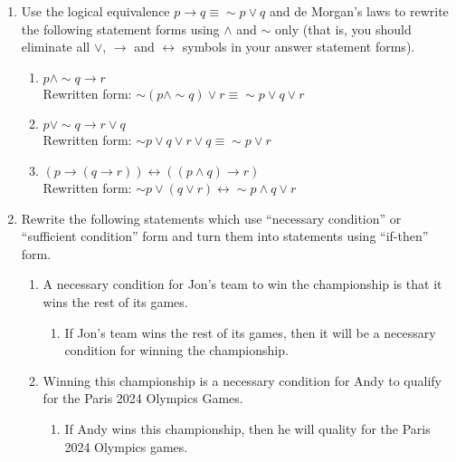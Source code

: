 \documentclass{article}
\begin{document}
\begin{enumerate}
		\item Use the logical equivalence \( p \rightarrow q \equiv \sim p \lor q \) and de Morgan’s laws to rewrite the following statement forms using \( \land \) and \( \sim \) only (that is, you should eliminate all \( \lor \), \( \rightarrow \) and \( \leftrightarrow \) symbols in your answer statement forms).
		\begin{enumerate}
			\item \( p \land \sim q \rightarrow r \) \\
			Rewritten form: \( \sim (p \land \sim q) \lor r \equiv \sim p \lor q \lor r \)
			
			\item \( p \lor \sim q \rightarrow r \lor q \) \\
			Rewritten form: \( \sim p \lor q \lor r \lor q \equiv \sim p \lor r \)
			
			\item \( (p \rightarrow (q \rightarrow r)) \leftrightarrow ((p \land q) \rightarrow r) \) \\
			Rewritten form: \( \sim p \lor (q \lor r) \leftrightarrow \sim p \land q \lor r \)
		\end{enumerate}
		
		\item Rewrite the following statements which use “necessary condition” or “sufficient condition” form and turn them into statements using “if-then” form.
		\begin{enumerate}
			\item A necessary condition for Jon’s team to win the championship is that it wins the rest of its games. \\
			\begin{enumerate}
				\item  If Jon’s team wins the rest of its games, then it will be a necessary condition for winning the championship.
			\end{enumerate} 
			\item Winning this championship is a necessary condition for Andy to qualify for the Paris 2024 Olympics Games.
				\begin{enumerate}
					\item If Andy wins this championship, then he will quality for the Paris 2024 Olympics games.
				\end{enumerate}
		\end{enumerate}
	\end{enumerate}
	
\end{document}
